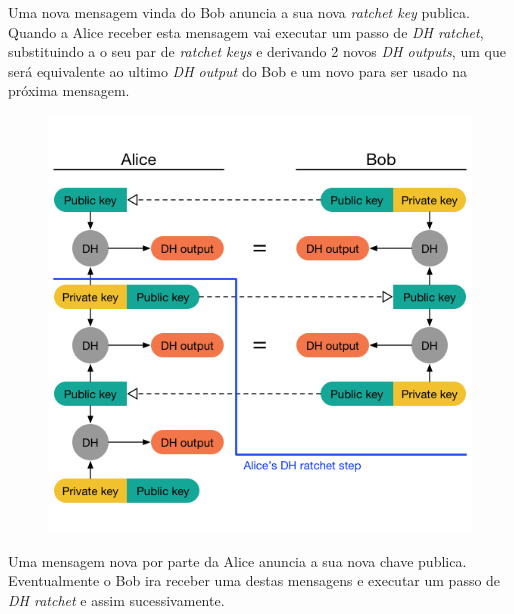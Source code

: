 Uma nova mensagem vinda do Bob anuncia a sua nova \textit{ratchet key} publica. Quando a Alice receber esta mensagem vai executar um passo de \textit{DH ratchet}, substituindo a o seu par de \textit{ratchet keys} e derivando 2 novos \textit{DH outputs}, um que será equivalente ao ultimo \textit{DH output} do Bob e um novo para ser usado na próxima mensagem.

\begin{figure}[H]
\begin{center}
\includegraphics[width=12cm]{img/DH3.png}
\caption{}
\label{diagram:DH3}
\centering
\end{center}
\end{figure}

Uma mensagem nova por parte da Alice anuncia a sua nova chave publica. Eventualmente o Bob ira receber uma destas mensagens e executar um passo de \textit{DH ratchet} e assim sucessivamente.

